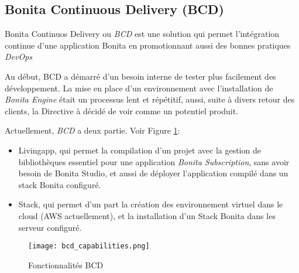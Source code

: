 \subsection{Bonita Continuous Delivery (BCD)} \label{bcd}
Bonita Continuos Delivery ou \textit{BCD} est une solution qui permet l'intégration continue d'une application Bonita en promotionnant aussi des bonnes pratiques \emph{DevOps}

Au début, BCD a démarré d'un besoin interne de tester plus facilement des développement. La mise en place d'un environnement avec l'installation de \textit{Bonita Engine} était un processus lent et répétitif, aussi, suite à divers retour des clients, la Directive à décidé de voir comme un potentiel produit.

Actuellement, \textit{BCD} a deux partie. Voir Figure \ref{fig:bcd_cap}:
\begin{itemize}
  \item Livingapp, qui permet la compilation d'un projet avec la gestion de bibliothèques essentiel pour une application \textit{Bonita Subscription}, sans avoir besoin de Bonita Studio, et aussi de déployer l'application compilé dans un stack Bonita configuré.
  \item Stack, qui permet d'un part la création des environnement virtuel dans le cloud (AWS actuellement), et la installation d'un Stack Bonita dans les serveur configuré.
\end{itemize}

\begin{figure}[!ht]
\centering
\texttt{[image: bcd\_capabilities.png]}
\caption{Fonctionnalités BCD}
\label{fig:bcd_cap}
\end{figure}

